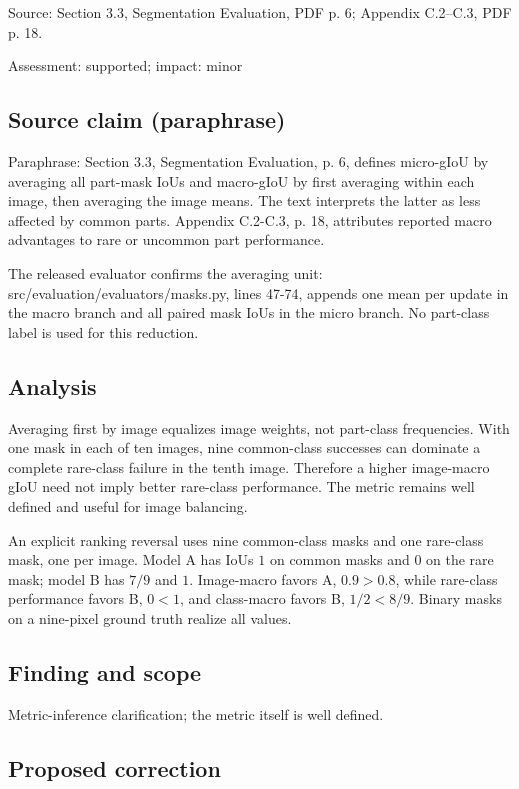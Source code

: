 \documentclass[11pt]{article}
\begin{document}
Source: Section 3.3, Segmentation Evaluation, PDF p. 6; Appendix C.2–C.3, PDF p. 18.

Assessment: supported; impact: minor

\subsection*{Source claim (paraphrase)}

Paraphrase: Section 3.3, Segmentation Evaluation, p. 6, defines micro-gIoU by averaging all part-mask IoUs and macro-gIoU by first averaging within each image, then averaging the image means. The text interprets the latter as less affected by common parts. Appendix C.2-C.3, p. 18, attributes reported macro advantages to rare or uncommon part performance.

The released evaluator confirms the averaging unit: src/evaluation/evaluators/masks.py, lines 47-74, appends one mean per update in the macro branch and all paired mask IoUs in the micro branch. No part-class label is used for this reduction.

\subsection*{Analysis}

Averaging first by image equalizes image weights, not part-class frequencies. With one mask in each of ten images, nine common-class successes can dominate a complete rare-class failure in the tenth image. Therefore a higher image-macro gIoU need not imply better rare-class performance. The metric remains well defined and useful for image balancing.

An explicit ranking reversal uses nine common-class masks and one rare-class mask, one per image. Model A has IoUs \(1\) on common masks and \(0\) on the rare mask; model B has \(7/9\) and \(1\). Image-macro favors A, \(0.9>0.8\), while rare-class performance favors B, \(0<1\), and class-macro favors B, \(1/2<8/9\). Binary masks on a nine-pixel ground truth realize all values.

\subsection*{Finding and scope}

Metric-inference clarification; the metric itself is well defined.

\subsection*{Proposed correction}
\end{document}
